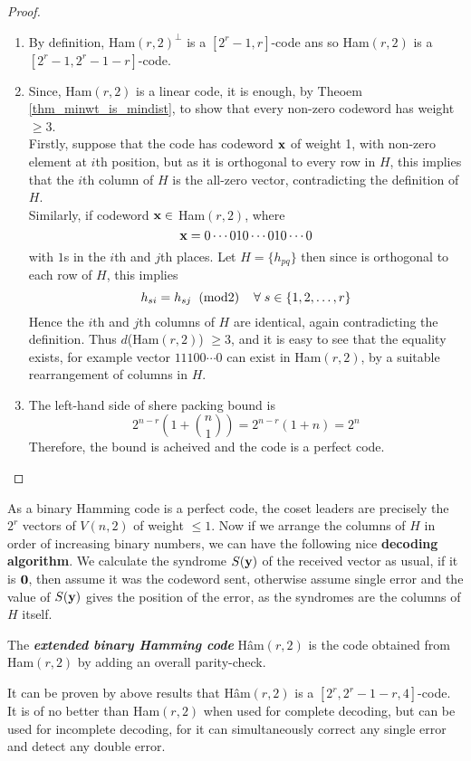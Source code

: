 \documentclass[../main.tex]{subfiles}
\begin{document}
\begin{proof}
	$\;$ 
	\begin{enumerate}[label=(\roman*)]
	\itemsep-1mm
		\item By definition, Ham$(r,2)^\perp$ is a $[2^r-1,r]$-code ans so Ham$(r,2	)$ is a $[2^r-1, 2^r-1-r]$-code.
		\item Since, Ham$(r,2)$ is a linear code, it is enough, by Theoem \ref{thm_minwt_is_mindist}, to show that every non-zero codeword has weight$\geq 3$.\\
		Firstly, suppose that the code has codeword $\textbf{x}$ of weight 1, with non-zero element at $i$th position, but as it is orthogonal to every row in $H$, this implies that the $i$th column of $H$ is the all-zero vector, contradicting the definition of $H$.\\
		Similarly, if codeword $\textbf{x} \in$ Ham$(r,2)$, where 
		\[
			\textbf{x} = 0\cdots 010\cdots 010\cdots 0
		\]
		with $1$s in the $i$th and $j$th places. Let $H = \{h_{pq}\}$ then since  is orthogonal to each row of $H$, this implies
		\[
			h_{si} = h_{sj} \hspace{2mm}(\text{mod} 2)\hspace{4mm} \forall\; s \in \{1,2,\ldots,r\}
		\]  
		 Hence the $i$th and $j$th columns of $H$ are identical, again contradicting the definition.
		 Thus $d$(Ham$(r,2)$) $\geq 3$, and it is easy to see that the equality exists, for example vector $11100\cdots 0$ can exist in Ham$(r,2)$, by a suitable rearrangement of columns in $H$.
		 \item The left-hand side of shere packing bound is
		 \[
		 	2^{n-r}\left(1 + \binom{n}{1}\right) = 2^{n-r}(1+n) = 2^n
		 \]  
		 Therefore, the bound is acheived and the code is a perfect code.
	\end{enumerate}	
	
\end{proof}

As a binary Hamming code is a perfect code, the coset leaders are precisely the $2^r$ vectors of $V(n,2)$ of weight $\leq 1$. Now if we arrange the columns of $H$ in order of increasing binary numbers, we can have the following nice \textbf{decoding algorithm}. We calculate the syndrome $S(\textbf{y})$ of the received vector  as usual, if it is $\textbf{0}$, then assume it was the codeword sent, otherwise assume single error and the value of $S(\textbf{y})$ gives the position of the error, as the syndromes are the columns of $H$ itself.

\begin{defn}
	The \textbf{\emph{extended binary Hamming code}} H\^{a}m$(r,2)$ is the code obtained from Ham$(r,2)$ by adding an overall parity-check.
\end{defn}
It can be proven by above results that H\^{a}m$(r,2)$ is a $[2^r, 2^r-1-r,4]$-code. It is of no better than Ham$(r,2)$ when used for complete decoding, but can be used for incomplete decoding, for it can simultaneously correct any single error and detect any double error.\\
\end{document}
